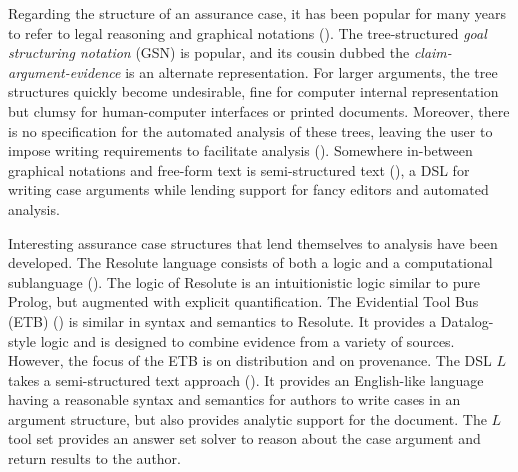 Regarding the structure of an assurance case, it has been popular for many years to refer to legal reasoning and graphical notations (\cite{kelly04}).  
The tree-structured {\em goal structuring notation\/} (GSN) is popular, and its cousin dubbed the {\em claim-argument-evidence\/} is an alternate representation.  
For larger arguments, the tree structures quickly become undesirable, fine for computer internal representation but clumsy for human-computer interfaces or printed documents.  Moreover, there is no specification for the automated analysis of these trees, leaving the user to impose writing requirements to facilitate analysis (\cite{rushby10}).  Somewhere in-between graphical notations and free-form text is semi-structured text (\cite{CMK08}), a DSL for writing case arguments while lending support for fancy editors and automated analysis.

Interesting assurance case structures that lend themselves to analysis have been developed.  
The Resolute language consists of both a logic and a computational sublanguage (\cite{Resolute}). The logic of Resolute is an intuitionistic logic similar to pure Prolog, but augmented with explicit quantification. 
The Evidential Tool Bus (ETB) (\cite{ETB}) is similar in syntax and semantics to Resolute. It provides a Datalog-style logic and is designed to combine evidence from a variety of sources. However, the focus of the ETB is on distribution and on provenance.  
The DSL $L$ takes a semi-structured text approach (\cite{CertWareABSA}).  It provides an English-like language having a reasonable syntax and semantics for authors to write cases in an argument structure, but also provides analytic support for the document.  The $L$ tool set provides an answer set solver to reason about the case argument and return results to the author. 


